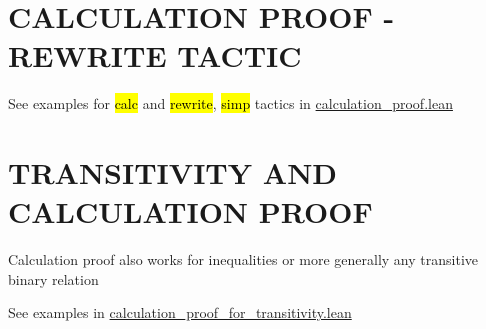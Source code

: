 \section{CALCULATION PROOF - REWRITE TACTIC}

See examples for \hl{calc} and \hl{rewrite}, \hl{simp} tactics in \href{theorem_proving_in_lean_4/theorem_proving/calculation_proof.lean}{calculation\_proof.lean}

\section{TRANSITIVITY AND CALCULATION PROOF}

Calculation proof also works for inequalities or more generally any transitive binary relation

See examples in \href{../theorem_proving_in_lean_4/theorem_proving/calculation_proof_for_transitivity.lean}{calculation\_proof\_for\_transitivity.lean}

